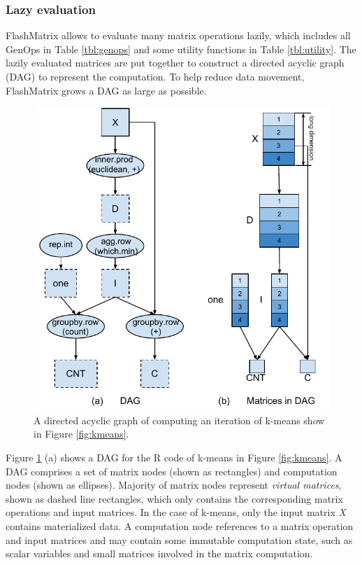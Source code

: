 \subsubsection{Lazy evaluation} \label{sec:lazy_eval}
FlashMatrix allows to evaluate many matrix operations lazily, which includes
all GenOps in Table \ref{tbl:genops} and some utility functions in Table
\ref{tbl:utility}. The lazily evaluated matrices are put together to construct
a directed acyclic graph (DAG) to represent the computation. To help reduce data
movement, FlashMatrix grows a DAG as large as possible.

\begin{figure}
	\centering
	\includegraphics[scale=0.6]{FlashMatrix_figs/KMeans.pdf}
	\caption{A directed acyclic graph of computing an iteration of k-means
	show in Figure \ref{fig:kmeans}.}
	\label{fig:DAG}
\end{figure}

Figure \ref{fig:DAG} (a) shows a DAG for the R code of k-means in Figure
\ref{fig:kmeans}. A DAG comprises a set of matrix nodes (shown as rectangles)
and computation nodes (shown as ellipses). Majority of matrix nodes represent
\textit{virtual matrices}, shown as dashed line rectangles, which only contains
the corresponding matrix operations and input matrices. In the case of k-means,
only the input matrix \textit{X} contains materialized data.
A computation node references to a matrix operation and input matrices and
may contain some immutable computation state, such as scalar variables and
small matrices involved in the matrix computation. 

